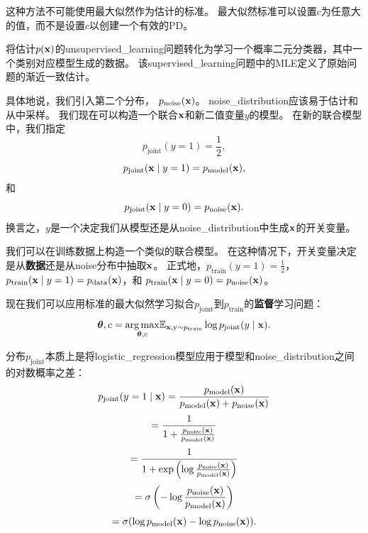 这种方法不可能使用最大似然作为估计的标准。
最大似然标准可以设置$c$为任意大的值，而不是设置$c$以创建一个有效的\gls{PD}。


将估计$p(\mathbf{x})$的\gls{unsupervised_learning}问题转化为学习一个概率二元分类器，其中一个类别对应模型生成的数据。
该\gls{supervised_learning}问题中的\gls{MLE}定义了原始问题的渐近一致估计。


具体地说，我们引入第二个分布， $p_{\text{noise}}(\mathbf{x})$。
\gls{noise_distribution}应该易于估计和从中采样。
我们现在可以构造一个联合$\mathbf{x}$和新二值变量$y$的模型。
在新的联合模型中，我们指定
\begin{equation}
	p_{\text{joint}} (y = 1) = \frac{1}{2},
\end{equation}
\begin{equation}
	p_{\text{joint}} (\mathbf{x} \mid y = 1) = p_{\text{model}} (\mathbf{x}),
\end{equation}
和
\begin{equation}
	p_{\text{joint}} (\mathbf{x} \mid y = 0) = p_{\text{noise}}(\mathbf{x}).
\end{equation}
换言之，$y$是一个决定我们从模型还是从\gls{noise_distribution}中生成$\mathbf{x}$的开关变量。


我们可以在训练数据上构造一个类似的联合模型。
在这种情况下，开关变量决定是从\textbf{数据}还是从\gls{noise}分布中抽取$\mathbf{x}$。
正式地，$p_{\text{train}}(y = 1) = \frac{1}{2}$，$p_{\text{train}}( \mathbf{x} \mid y = 1) = p_{\text{data}}( \mathbf{x})$，和
$p_{\text{train}}(\mathbf{x} \mid y = 0) = p_{\text{noise}}(\mathbf{x})$。


现在我们可以应用标准的最大似然学习拟合$p_{\text{joint}}$到$p_{\text{train}}$的\textbf{监督}学习问题：
\begin{equation}
	\boldsymbol{\theta}, c = \underset{ \boldsymbol{\theta}, c}{\arg\max} \mathbb{E}_{\mathbf{x}, \mathrm{y} \sim p_{\text{train}}} \log 
	p_{\text{joint}} (y \mid \mathbf{x}).
\end{equation}


分布$p_{\text{joint}}$本质上是将\gls{logistic_regression}模型应用于模型和\gls{noise_distribution}之间的对数概率之差：
\begin{equation}
	p_{\text{joint}} (y = 1 \mid \mathbf{x}) = \frac{ p_{\text{model}}(\mathbf{x}) }{ p_{\text{model}}(\mathbf{x}) + p_{\text{noise}}(\mathbf{x}) }
\end{equation}
\begin{equation}
 = \frac{1}{1 + \frac{ p_{\text{noise}}(\mathbf{x}) }{ p_{\text{model}}(\mathbf{x}) }}
\end{equation}
\begin{equation}
= \frac{1}{1 + \exp \left( \log \frac{ p_{\text{noise}}(\mathbf{x}) }{ p_{\text{model}}(\mathbf{x}) } \right)}
\end{equation}
\begin{equation}
	= \sigma \left( - \log \frac{ p_{\text{noise}} (\mathbf{x}) }{ p_{\text{model}} (\mathbf{x}) } \right)
\end{equation}
\begin{equation}
	= \sigma ( \log p_{\text{model}} (\mathbf{x}) - \log p_{\text{noise}} (\mathbf{x})  ) .
\end{equation}



